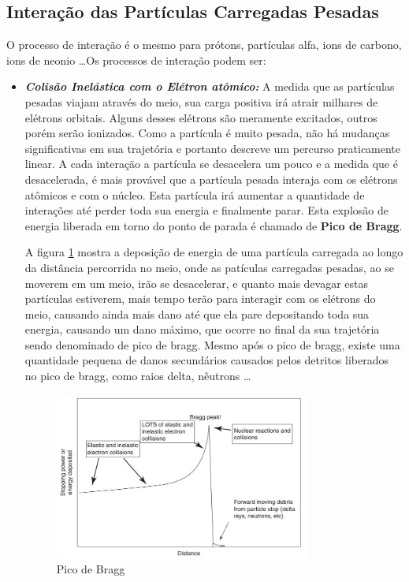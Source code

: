 \documentclass[11pt,a4paper]{article}
\begin{document}
        \subsection{Interação das Partículas Carregadas Pesadas}

            O processo de interação é o mesmo para prótons, partículas alfa, ions de carbono, ions de neonio \dots Os processos de interação podem ser:

            \begin{itemize}
                \item \textbf{\textit{\textcolor{CarnationPink}{Colisão Inelástica com o Elétron atômico}:}} A medida que as partículas pesadas viajam através do meio, sua carga positiva irá atrair milhares de elétrons orbitais. Alguns desses elétrons são meramente excitados, outros porém serão ionizados. Como a partícula é muito pesada, não há mudanças significativas em sua trajetória e portanto descreve um percurso praticamente linear. A cada interação a partícula se desacelera um pouco e a medida que é desacelerada, é mais provável que a partícula pesada interaja com os elétrons atômicos e com o núcleo. Esta partícula irá aumentar a quantidade de interações até perder toda sua energia e finalmente parar. Esta explosão de energia liberada em torno do ponto de parada é chamado de \textbf{\textcolor{CarnationPink}{Pico de Bragg}}.
                
                A figura \ref{fig:picodeBragg} mostra a deposição de energia de uma partícula carregada ao longo da distância percorrida no meio, onde as patículas carregadas pesadas, ao se moverem em um meio, irão se desacelerar, e quanto mais devagar estas partículas estiverem, mais tempo terão para interagir com os elétrons do meio, causando ainda mais dano até que ela pare depositando toda sua energia, causando um dano máximo, que ocorre no final da sua trajetória sendo denominado de pico de bragg. Mesmo após o pico de bragg, existe uma quantidade pequena de danos secundários causados pelos detritos liberados no pico de bragg, como raios delta, nêutrons \dots
                
                \begin{figure}[h]
                    \centering
                    \includegraphics[width=0.8\textwidth]{Imagens/picodeBragg.JPG}
                    \caption{Pico de Bragg}
                    \label{fig:picodeBragg}                
                \end{figure}
                


\end{itemize}
\end{document}
